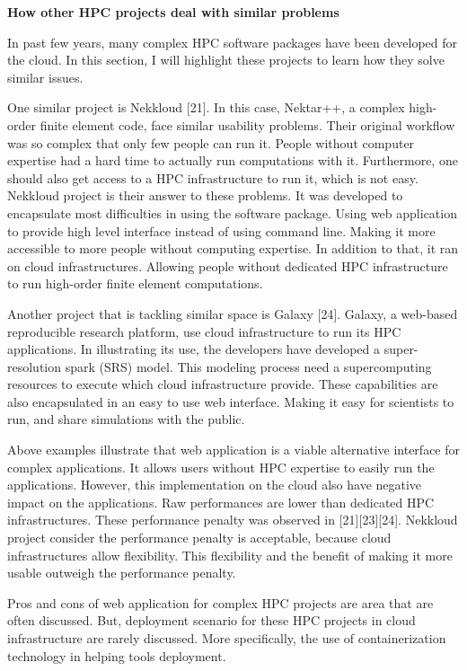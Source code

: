\documentclass[]{article}
\begin{document}
\textbf{How other HPC projects deal with similar problems}

In past few years, many complex HPC software packages have been
developed for the cloud. In this section, I will highlight these
projects to learn how they solve similar issues.

One similar project is Nekkloud {[}21{]}. In this case, Nektar++, a
complex high-order finite element code, face similar usability problems.
Their original workflow was so complex that only few people can run it.
People without computer expertise had a hard time to actually run
computations with it. Furthermore, one should also get access to a HPC
infrastructure to run it, which is not easy. Nekkloud project is their
answer to these problems. It was developed to encapsulate most
difficulties in using the software package. Using web application to
provide high level interface instead of using command line. Making it
more accessible to more people without computing expertise. In addition
to that, it ran on cloud infrastructures. Allowing people without
dedicated HPC infrastructure to run high-order finite element
computations.

Another project that is tackling similar space is Galaxy {[}24{]}.
Galaxy, a web-based reproducible research platform, use cloud
infrastructure to run its HPC applications. In illustrating its use, the
developers have developed a super-resolution spark (SRS) model. This
modeling process need a supercomputing resources to execute which cloud
infrastructure provide. These capabilities are also encapsulated in an
easy to use web interface. Making it easy for scientists to run, and
share simulations with the public.

Above examples illustrate that web application is a viable alternative
interface for complex applications. It allows users without HPC
expertise to easily run the applications. However, this implementation
on the cloud also have negative impact on the applications. Raw
performances are lower than dedicated HPC infrastructures. These
performance penalty was observed in {[}21{]}{[}23{]}{[}24{]}. Nekkloud
project consider the performance penalty is acceptable, because cloud
infrastructures allow flexibility. This flexibility and the benefit of
making it more usable outweigh the performance penalty.

Pros and cons of web application for complex HPC projects are area that
are often discussed. But, deployment scenario for these HPC projects in
cloud infrastructure are rarely discussed. More specifically, the use of
containerization technology in helping tools deployment.
\end{document}
